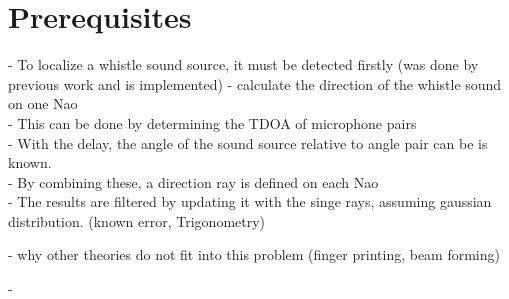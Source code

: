 \chapter{Prerequisites}

- To localize a whistle sound source, it must be detected firstly (was done by previous work
and is implemented)
- calculate the direction of the whistle sound on one Nao\\
- This can be done by determining the \ac{TDOA} of microphone pairs\\
- With the delay, the angle of the sound source relative to angle pair
can be is known.\\
- By combining these, a direction ray is defined on each Nao\\
- The results are filtered by updating it with the singe rays, assuming
gaussian distribution. (known error, Trigonometry)

- why other theories do not fit into this problem
(finger printing, beam forming)

-






%
%

%
